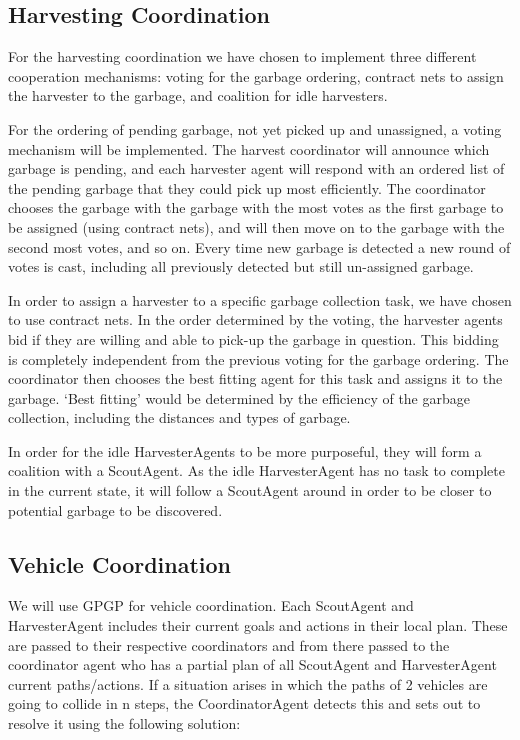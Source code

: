 \subsection{Harvesting Coordination}

For the harvesting coordination we have chosen to implement three different cooperation mechanisms: voting for the garbage ordering, contract nets to assign the harvester to the garbage, and coalition for idle harvesters. 

For the ordering of pending garbage, not yet picked up and unassigned, a voting mechanism will be implemented. The harvest coordinator will announce which garbage is pending, and each harvester agent will respond with an ordered list of the pending garbage that they could pick up most efficiently. The coordinator chooses the garbage with the garbage with the most votes as the first garbage to be assigned (using contract nets), and will then move on to the garbage with the second most votes, and so on. Every time new garbage is detected a new round of votes is cast, including all previously detected but still un-assigned garbage. 

In order to assign a harvester to a specific garbage collection task, we have chosen to use contract nets. In the order determined by the voting, the harvester agents bid if they are willing and able to pick-up the garbage in question. This bidding is completely independent from the previous voting for the garbage ordering. The coordinator then chooses the best fitting agent for this task and assigns it to the garbage. `Best fitting' would be determined by the efficiency of the garbage collection, including the distances and types of garbage. 

In order for the idle HarvesterAgents to be more purposeful, they will form a coalition with a ScoutAgent. As the idle HarvesterAgent has no task to complete in the current state, it will follow a ScoutAgent around in order to be closer to potential garbage to be discovered. 

\subsection{Vehicle Coordination}

We will use GPGP for vehicle coordination. Each ScoutAgent and HarvesterAgent includes their current goals and actions in their local plan. These are passed to their respective coordinators and from there passed to the coordinator agent who has a partial plan of all ScoutAgent and HarvesterAgent current paths/actions. If a situation arises in which the paths of 2 vehicles are going to collide in n steps, the CoordinatorAgent detects this and sets out to resolve it using the following solution:

